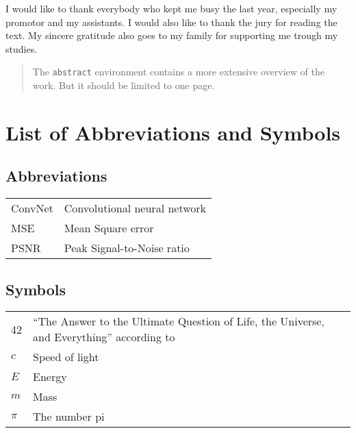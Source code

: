 \documentclass[master=ewit,english]{kulemt}
\begin{document}
\begin{preface}
  I would like to thank everybody who kept me busy the last year,
  especially my promotor and my assistants. I would also like to thank the
  jury for reading the text. My sincere gratitude also goes to my family
  for supporting me trough my studies.
\end{preface}

\tableofcontents*

\begin{abstract}
  The \texttt{abstract} environment contains a more extensive overview of
  the work. But it should be limited to one page.

\end{abstract}

\listoffiguresandtables
\chapter{List of Abbreviations and Symbols}
\section*{Abbreviations}
\begin{flushleft}
  \renewcommand{\arraystretch}{1.1}
  \begin{tabularx}{\textwidth}{@{}p{12mm}X@{}}
    ConvNet   & Convolutional neural network \\
    MSE   & Mean Square error \\
    PSNR  & Peak Signal-to-Noise ratio \\
  \end{tabularx}
\end{flushleft}
\section*{Symbols}
\begin{flushleft}
  \renewcommand{\arraystretch}{1.1}
  \begin{tabularx}{\textwidth}{@{}p{12mm}X@{}}
    42    & ``The Answer to the Ultimate Question of Life, the Universe,
            and Everything'' according to \cite{h2g2} \\
    $c$   & Speed of light \\
    $E$   & Energy \\
    $m$   & Mass \\
    $\pi$ & The number pi \\
  \end{tabularx}
\end{flushleft}
\end{document}
